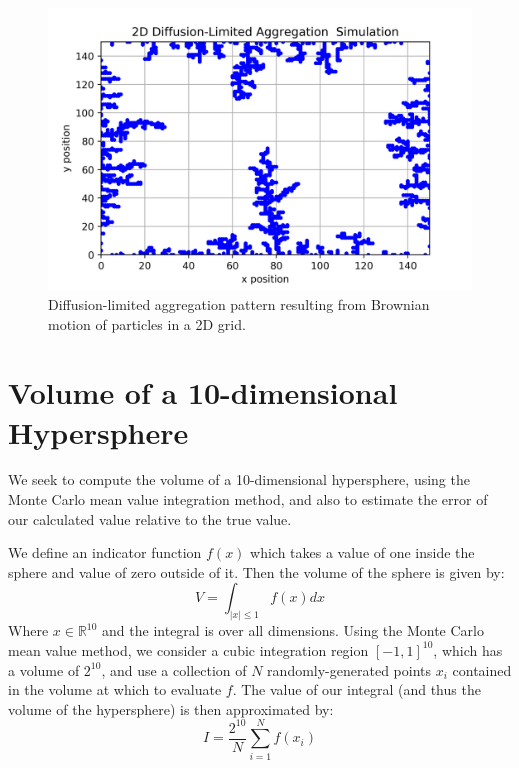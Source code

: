 \documentclass{article}
\begin{document}
\begin{figure}[H]
	\centering
	\includegraphics[width=\linewidth]{../images/brownian_dla.png}
	\caption{Diffusion-limited aggregation pattern resulting from Brownian motion of particles in a 2D grid.}
	\label{fig:q1_c}
\end{figure}

\section{Volume of a 10-dimensional Hypersphere}

We seek to compute the volume of a 10-dimensional hypersphere, using the Monte Carlo mean value integration method, and also to estimate the error of our calculated value relative to the true value.

We define an indicator function $f(x)$ which takes a value of one inside the sphere and value of zero outside of it. Then the volume of the sphere is given by:
\begin{equation}
	V = \int_{|x|\leq 1}f(x) dx
\end{equation}
Where $x \in \mathbb{R}^{10}$ and the integral is over all dimensions. Using the Monte Carlo mean value method, we consider a cubic integration region $[-1,1]^{10}$, which has a volume of $2^{10}$, and use a collection of $N$ randomly-generated points $x_i$ contained in the volume at which to evaluate $f$. The value of our integral (and thus the volume of the hypersphere) is then approximated by:
\begin{equation}
	I = \frac{2^{10}}{N}\sum_{i=1}^N f(x_i)
\end{equation}
\end{document}
